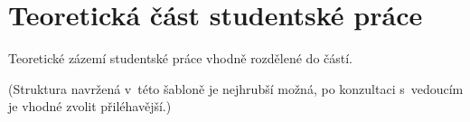\chapter{Teoretická část studentské práce}

Teoretické zázemí studentské práce vhodně rozdělené do částí.

(Struktura navržená v~této šabloně je nejhrubší možná, po konzultaci s~vedoucím je vhodné zvolit přiléhavější.)

